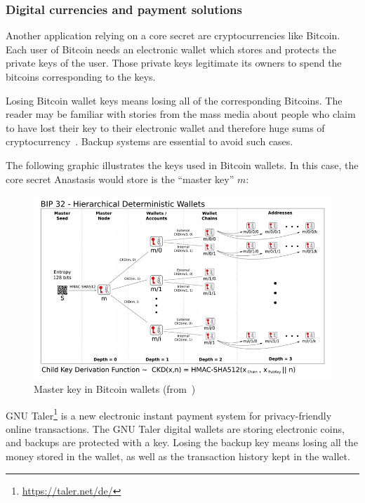 \subsubsection{Digital currencies and payment solutions}

Another application relying on a core secret are cryptocurrencies like
Bitcoin. Each user of Bitcoin needs an electronic wallet which stores
and protects the private keys of the user. Those private keys
legitimate its owners to spend the bitcoins corresponding to the
keys.~\cite{LLLW*2017}

Losing Bitcoin wallet keys means losing all of the corresponding
Bitcoins.  The reader may be familiar with stories from the mass media
about people who claim to have lost their key to their electronic
wallet and therefore huge sums of
cryptocurrency~\cite{millions_lost}. Backup systems are essential to
avoid such cases.

The following graphic illustrates the keys used in Bitcoin
wallets. In this case, the core secret Anastasis would store
is the ``master key'' $m$:

\begin{figure}[H]
	\centering
	\includegraphics[scale=3.5]{images/bitcoin-keys.png}
	\caption[Master key in Bitcoin wallets]{Master key in Bitcoin wallets (from~\cite{bitcoin-keys})}
	\label{fig:bitcoin_keys}
\end{figure}

GNU Taler\footnote{\url{https://taler.net/de/}} is a new electronic instant payment system for
privacy-friendly online transactions. The GNU Taler digital wallets are
storing electronic coins, and backups are protected with a key.
Losing the backup key means losing all the money stored in the wallet,
as well as the transaction history kept in the wallet.

